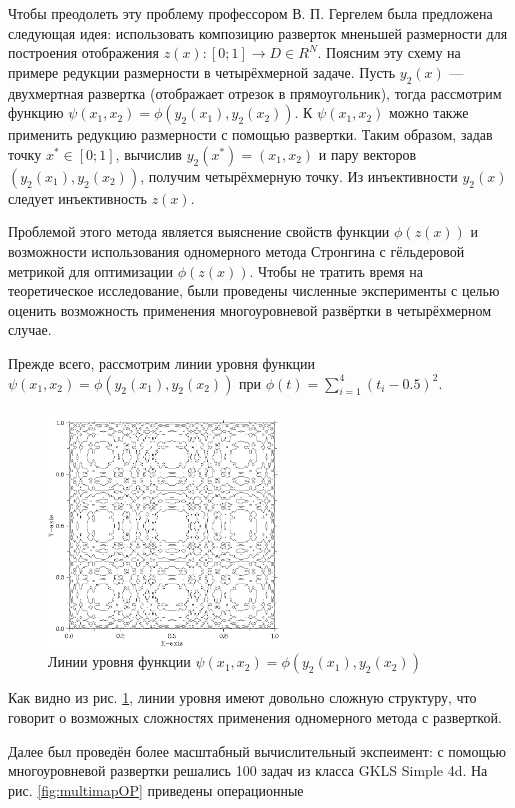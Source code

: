 \par
Чтобы преодолеть эту проблему профессором В. П. Гергелем была предложена следующая идея: использовать композицию разверток мненьшей размерности для построения отображения
\(z(x): [0;1] \rightarrow D \in R^N\).
Поясним эту схему на примере редукции размерности в четырёхмерной задаче. Пусть \(y_2(x)\) --- двухмертная развертка (отображает отрезок в прямоугольник), тогда рассмотрим функцию
\(\psi(x_1,x_2)=\phi(y_2(x_1), y_2(x_2))\). К \(\psi(x_1,x_2)\) можно также применить редукцию размерности с помощью развертки. Таким образом, задав точку \(x^*\in [0;1]\),
вычислив \(y_2(x^*)=(x_1,x_2)\) и пару векторов \((y_2(x_1), y_2(x_2))\), получим четырёхмерную точку. Из инъективности \(y_2(x)\) следует инъективность \(z(x)\).
\par
Проблемой этого метода является выяснение свойств функции \(\phi(z(x))\) и возможности использования одномерного метода Стронгина с гёльдеровой метрикой для оптимизации \(\phi(z(x))\).
Чтобы не тратить время на теоретическое исследование, были проведены численные эксперименты с целью оценить возможность применения многоуровневой развёртки в четырёхмерном случае.
\par
Прежде всего, рассмотрим линии уровня функции \(\psi(x_1,x_2)=\phi(y_2(x_1), y_2(x_2))\) при \(\phi(t)=\sum_{i=1}^{4}(t_i-0.5)^2\).
\begin{figure}[ht]
	\center
  \includegraphics[width=0.55\textwidth]{pictures/multimap_isolines.png}
  \caption{Линии уровня функции \(\psi(x_1,x_2)=\phi(y_2(x_1), y_2(x_2))\)}
  \label{fig:1}
\end{figure}
Как видно из рис. \ref{fig:1}, линии уровня имеют довольно сложную структуру, что говорит о возможных сложностях применения одномерного метода с разверткой.
\par
Далее был проведён более масштабный вычислительный экспеимент: с помощью многоуровневой развертки решались 100 задач из класса GKLS Simple 4d. На рис. \ref{fig:multimapOP} приведены операционные
